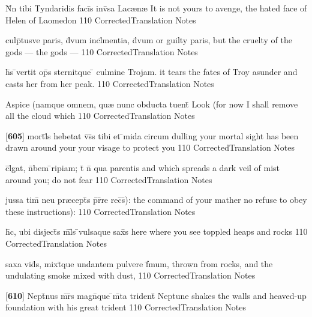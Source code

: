 \latline
  {N\={}n tibi Tyndaridis faci\={}s inv\={\macron {\i}}sa Lac{\ae}n{\ae}}
  { It is not yours to avenge, the hated face of Helen of Laomedon }
  {110}
  { CorrectedTranslation }
  { Notes }


\latline
  {culp\={}tusve paris, d\={\macron {\i}}vum incl\={}mentia, d\={\macron {\i}}vum}
  { or guilty paris, but the cruelty of the gods --- the gods --- }
  {110}
  { CorrectedTranslation }
  { Notes }


\latline
  {h\={}s \={}vertit op\={}s sternitque \={} culmine Trojam.}
  { it tears the fates of Troy asunder and casts her from her peak. }
  {110}
  { CorrectedTranslation }
  { Notes }


\latline
  {Aspice (namque omnem, qu{\ae} nunc obducta tuent\={\macron {\i}}}
  { Look (for now I shall remove all the cloud which  }
  {110}
  { CorrectedTranslation }
  { Notes }


\latline
  {[\textbf{605}] mort\={}l\={\macron {\i}}s hebetat v\={\macron {\i}}s\={}s tibi et \={}mida circum}
  { dulling your mortal sight has been drawn around your your visage to protect you }
  {110}
  { CorrectedTranslation }
  { Notes }


\latline
  {c\={}l\={\macron {\i}}gat, n\={}bem \={}ripiam; t\={} n\={} qua parentis}
  { and which spreads a dark veil of mist around you; do not fear  }
  {110}
  { CorrectedTranslation }
  { Notes }


\latline
  {jussa tim\={} neu pr{\ae}cept\={\macron {\i}}s p\={}r\={}re rec\={}s\={}):}
  { the command of your mather no refuse to obey these instructions): }
  {110}
  { CorrectedTranslation }
  { Notes }


\latline
  {h\={\macron {\i}}c, ubi disject\={}s m\={}l\={}s \={}vulsaque sax\={\macron {\i}}s}
  { here where you see toppled heaps and rocks }
  {110}
  { CorrectedTranslation }
  { Notes }


\latline
  {saxa vid\={}s, mixt\={}que undantem pulvere f\={}mum,}
  { thrown from rocks, and the undulating smoke mixed with dust, }
  {110}
  { CorrectedTranslation }
  { Notes }


\latline
  {[\textbf{610}] Nept\={}nus m\={}r\={}s magn\={}que \={}m\={}ta trident\={\macron {\i}}}
  { Neptune shakes the walls and heaved-up foundation with his great trident }
  {110}
  { CorrectedTranslation }
  { Notes }


